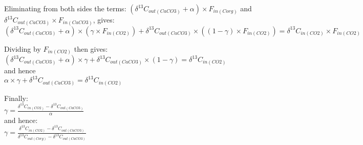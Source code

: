 \begin{enumerate}[noitemsep]
\vspace{2mm}

Eliminating from both sides the terms: \((\delta^{13}C_{out(CaCO3)}+\alpha)\times F_{in(Corg)}\) and \(\delta^{13}C_{out(CaCO3)}\times F_{in(CaCO3)}\), gives:
\vspace{1mm}
\\\((\delta^{13}C_{out(CaCO3)}+\alpha)\times (\gamma \times F_{in(CO2)})+\delta^{13}C_{out(CaCO3)}\times ((1-\gamma) \times F_{in(CO2)})=\delta^{13}C_{in(CO2)}\times F_{in(CO2)}\)

\vspace{2mm}

Dividing by \(F_{in(CO2)}\) then gives:
\vspace{1mm}
\\\((\delta^{13}C_{out(CaCO3)}+\alpha)\times \gamma+\delta^{13}C_{out(CaCO3)}\times (1-\gamma)=\delta^{13}C_{in(CO2)}\)
\vspace{1mm}
\\and hence
\vspace{1mm}
\\\(\alpha\times \gamma+\delta^{13}C_{out(CaCO3)}=\delta^{13}C_{in(CO2)}\)

\vspace{2mm}

Finally:
\vspace{2mm}
\\\(\gamma=\frac{\delta^{13}C_{in(CO2)}-\delta^{13}C_{out(CaCO3)}}{\alpha}\)
\vspace{1mm}
\\and hence:
\vspace{2mm}
\\\(\gamma=\frac{\delta^{13}C_{in(CO2)}-\delta^{13}C_{out(CaCO3)}}{\delta^{13}C_{out(Corg)} - \delta^{13}C_{out(CaCO3)}}\)

\vspace{2mm}


\end{enumerate}
